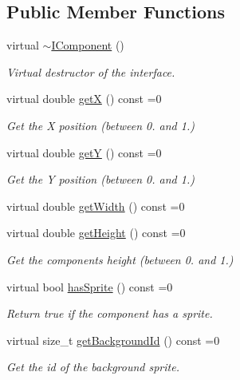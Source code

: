 \subsection*{Public Member Functions}
\begin{DoxyCompactItemize}
\item 
virtual \hyperlink{classarcade_1_1_i_component_a1d4ec4990f66b23a90c4da6b00b3a32f}{$\sim$\+I\+Component} ()
\begin{DoxyCompactList}\small\item\em Virtual destructor of the interface. \end{DoxyCompactList}\item 
virtual double \hyperlink{classarcade_1_1_i_component_ab9d24992e8519756d56c0282001eccce}{getX} () const =0
\begin{DoxyCompactList}\small\item\em Get the X position (between 0. and 1.) \end{DoxyCompactList}\item 
virtual double \hyperlink{classarcade_1_1_i_component_ad19f185c30ab99ed831d2c68fabf920f}{getY} () const =0
\begin{DoxyCompactList}\small\item\em Get the Y position (between 0. and 1.) \end{DoxyCompactList}\item 
virtual double \hyperlink{classarcade_1_1_i_component_a558e5d49736a3828753a4062d5c9bfb1}{get\+Width} () const =0
\item 
virtual double \hyperlink{classarcade_1_1_i_component_a77a3bed39227f11d06bb71e06ee2ee30}{get\+Height} () const =0
\begin{DoxyCompactList}\small\item\em Get the component\textquotesingle{}s height (between 0. and 1.) \end{DoxyCompactList}\item 
virtual bool \hyperlink{classarcade_1_1_i_component_a03ea8019a23fd44731a06548ef7e6ff3}{has\+Sprite} () const =0
\begin{DoxyCompactList}\small\item\em Return true if the component has a sprite. \end{DoxyCompactList}\item 
virtual size\+\_\+t \hyperlink{classarcade_1_1_i_component_a7d4c00172b0ba0e3dc63832a9234efbb}{get\+Background\+Id} () const =0
\begin{DoxyCompactList}\small\item\em Get the id of the background sprite. \end{DoxyCompactList}\item 

\end{DoxyCompactItemize}
